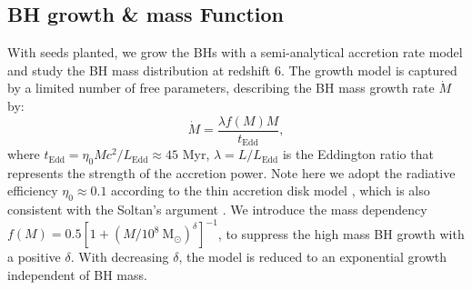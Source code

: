 \documentclass[nolinenumbers,preprint2,tighten]{aastex631}
\newcommand{\Msun}{\mathrm{M_\odot}}
\newcommand{\Mh}{M_\mathrm{h}}
\newcommand{\Mdot}{\dot{M}}
\newcommand{\tEdd}{t_\mathrm{Edd}}
\begin{document}
\begin{CJK*}{UTF8}{gbsn}
\vspace{2mm}
\subsection{BH growth \& mass Function}\label{sec:MF}
With seeds planted, we grow the BHs with a semi-analytical accretion rate model 
and study the BH mass distribution at redshift 6. 
The growth model is captured by a limited number of free parameters, 
describing the BH mass growth rate $\Mdot$ by: 
\begin{equation}
  \label{eq:mdot}
  \Mdot = \frac{\lambda f\left(M\right) M}{\tEdd},
\end{equation}
where $\tEdd = \eta_0  M c^2/L_{\mathrm{Edd}} \approx 45$ Myr,
$\lambda = L/L_\mathrm{Edd}$ is the Eddington ratio that represents the strength of the accretion power.
Note here we adopt the radiative efficiency $\eta_0 \approx 0.1 $ according to the thin accretion disk model 
\citep{1973A&A....24..337S}, which is also consistent with 
the Soltan's argument  \citep{1982MNRAS.200..115S,2002MNRAS.335..965Y}.
We introduce the mass dependency 
$f(M) = 0.5 \left[1+\left(M/10^8~\Msun\right)^\delta\right] ^ {-1}$, 
to suppress the high mass BH growth with a positive $\delta$. With decreasing $\delta$, 
the model is reduced to an exponential growth independent of BH mass.


\end{CJK*}
\end{document}
